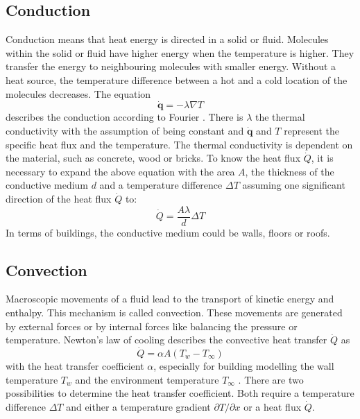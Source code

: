 \subsection{Conduction}
\label{subsection:conduction}

    Conduction means that heat energy is directed in a solid or fluid. Molecules within the solid or fluid have higher energy when the temperature is higher. They transfer the energy to neighbouring molecules with smaller energy. Without a heat source, the temperature difference between a hot and a cold location of the molecules decreases.\cite{Kuchling.2007}
    \newline The equation
    \begin{equation}
    \label{eq:fourier}
        \dot{\textbf{q}} = - \lambda \nabla T
    \end{equation}
    describes the conduction according to Fourier \cite{.2013}. There is $\lambda$ the thermal conductivity with the assumption of being constant and $\dot{\textbf{q}}$ and $T$ represent the specific heat flux and the temperature. The thermal conductivity is dependent on the material, such as concrete, wood or bricks. 
    \newline
    To know the heat flux $\dot{Q}$, it is necessary to expand the above equation with the area $A$, the thickness of the conductive medium $d$ and a temperature difference $\Delta T$ assuming one significant direction of the heat flux $\dot{Q}$ to:
    \begin{equation}
    \label{eq:conduction1}
        \dot{Q} = \frac{A\lambda}{d} \Delta T
    \end{equation}
    In terms of buildings, the conductive medium could be walls, floors or roofs.

\subsection{Convection}
\label{subsection:convection}

    Macroscopic movements of a fluid lead to the transport of kinetic energy and enthalpy. This mechanism is called convection. These movements are generated by external forces or by internal forces like balancing the pressure or temperature.\cite{.2013}
    \newline
    Newton's law of cooling describes the convective heat transfer $\dot{Q}$ as 
    \begin{equation}
    \label{eq:newton}
        \dot{Q} = \alpha A (T_w - T_\infty)
    \end{equation}
    with the heat transfer coefficient $\alpha$, especially for building modelling the wall temperature $T_w$ and the environment temperature $T_\infty$ \cite{Griesinger.2019}
    . There are two possibilities to determine the heat transfer coefficient. Both require a temperature difference $\Delta T$ and either a temperature gradient $\partial T/\partial x$ or a heat flux $\dot{Q}$.
    \cite{.2013} 

